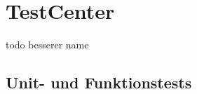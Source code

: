 \chapter{TestCenter}
\label{chap:testCenter} 

todo besserer name

\section{Unit- und Funktionstests}
\label{sec:testCenter.UnitundFunktionstests}